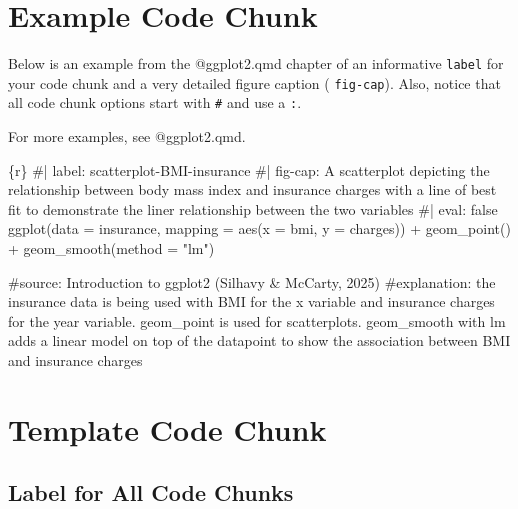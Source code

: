 \documentclass[
  english,
  letterpaper,
  DIV=11,
  numbers=noendperiod]{scrreprt}
\newenvironment{Shaded}{\begin{snugshade}}{\end{snugshade}}
\newcommand{\AttributeTok}[1]{\textcolor[rgb]{0.40,0.45,0.13}{#1}}
\newcommand{\CommentTok}[1]{\textcolor[rgb]{0.37,0.37,0.37}{#1}}
\newcommand{\FunctionTok}[1]{\textcolor[rgb]{0.28,0.35,0.67}{#1}}
\newcommand{\InformationTok}[1]{\textcolor[rgb]{0.37,0.37,0.37}{#1}}
\newcommand{\NormalTok}[1]{\textcolor[rgb]{0.00,0.23,0.31}{#1}}
\newcommand{\SpecialCharTok}[1]{\textcolor[rgb]{0.37,0.37,0.37}{#1}}
\newcommand{\StringTok}[1]{\textcolor[rgb]{0.13,0.47,0.30}{#1}}
\begin{document}
\section{Example Code Chunk}\label{example-code-chunk}

Below is an example from the @ggplot2.qmd chapter of an informative
\texttt{label} for your code chunk and a very detailed figure caption (
\texttt{fig-cap}). Also, notice that all code chunk options start with
\texttt{\#\textbar{}} and use a \texttt{:}.

For more examples, see @ggplot2.qmd.

\begin{Shaded}
\begin{Highlighting}[]
\InformationTok{\textasciigrave{}\textasciigrave{}\textasciigrave{}\{r\}}
\CommentTok{\#| label: scatterplot{-}BMI{-}insurance}
\CommentTok{\#| fig{-}cap: A scatterplot depicting the relationship between body mass index and insurance charges with a line of best fit to demonstrate the liner relationship between the two variables}
\CommentTok{\#| eval: false}
\FunctionTok{ggplot}\NormalTok{(}\AttributeTok{data =}\NormalTok{ insurance, }\AttributeTok{mapping =} \FunctionTok{aes}\NormalTok{(}\AttributeTok{x =}\NormalTok{ bmi, }\AttributeTok{y =}\NormalTok{ charges)) }\SpecialCharTok{+}
  \FunctionTok{geom\_point}\NormalTok{() }\SpecialCharTok{+}
  \FunctionTok{geom\_smooth}\NormalTok{(}\AttributeTok{method =} \StringTok{"lm"}\NormalTok{)}

\CommentTok{\#source: Introduction to ggplot2 (Silhavy \& McCarty, 2025)}
\CommentTok{\#explanation: the insurance data is being used with BMI for the x variable and insurance charges for the year variable. geom\_point is used for scatterplots. geom\_smooth with lm adds a linear model on top of the datapoint to show the association between BMI and insurance charges}
\InformationTok{\textasciigrave{}\textasciigrave{}\textasciigrave{}}
\end{Highlighting}
\end{Shaded}

\section{Template Code Chunk}\label{template-code-chunk}

\subsection{Label for All Code Chunks}\label{label-for-all-code-chunks}
\end{document}
